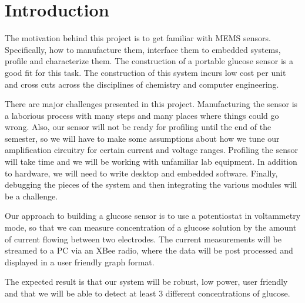 \section{Introduction}
The motivation behind this project is to get familiar with MEMS sensors. Specifically, how to
manufacture them, interface them to embedded systems, profile and characterize them. The
construction of a portable glucose sensor is a good fit for this task. The construction of this system
incurs low cost per unit and cross cuts across the disciplines of chemistry and computer engineering.

There are major challenges presented in this project. Manufacturing the sensor is a laborious process
with many steps and many places where things could go wrong. Also, our sensor will not be ready for
profiling until the end of the semester, so we will have to make some assumptions about how we tune
our amplification circuitry for certain current and voltage ranges. Profiling the sensor will take time
and we will be working with unfamiliar lab equipment. In addition to hardware, we will need to write
desktop and embedded software. Finally, debugging the pieces of the system and then integrating the
various modules will be a challenge.

Our approach to building a glucose sensor is to use a potentiostat in voltammetry mode, so that we can
measure concentration of a glucose solution by the amount of current flowing between two electrodes.
The current measurements will be streamed to a PC via an XBee radio, where the data will be post
processed and displayed in a user friendly graph format.

The expected result is that our system will be robust, low power, user friendly and that we will be able
to detect at least 3 different concentrations of glucose.

\cite{Gopinath:2006}